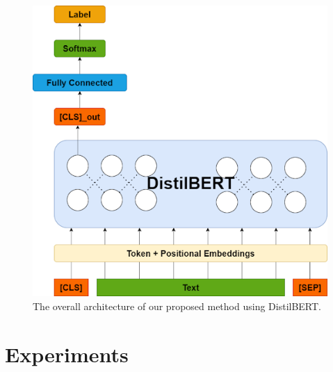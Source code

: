 \documentclass[sn-mathphys,Numbered]{sn-jnl}%
\theoremstyle{thmstyleone}%
\theoremstyle{thmstyletwo}%
\theoremstyle{thmstylethree}%
\begin{document}
\begin{figure}[htp]
\centering
\includegraphics[scale=.4]{distilbert.png}
\caption{The overall architecture of our proposed method using DistilBERT.}
\label{fig:distilbert}
\end{figure}

\section{Experiments}\label{experiments}
\end{document}
